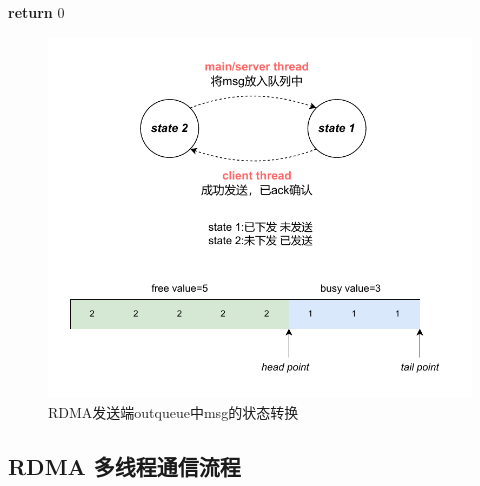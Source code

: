 {\begin{algorithm}
\begin{algorithmic}[1]
            \State
            \State {}
            \State \textbf{return} $0$
            \EndFunction
        \end{algorithmic}
    \end{algorithm}

    \begin{figure}[H]
        \centering
        \includegraphics[width=1.0\textwidth]{Img/send_state.drawio.pdf}
        \caption{RDMA发送端outqueue中msg的状态转换}
    \end{figure}


    \newpage
    \subsection{RDMA 多线程通信流程}

}
